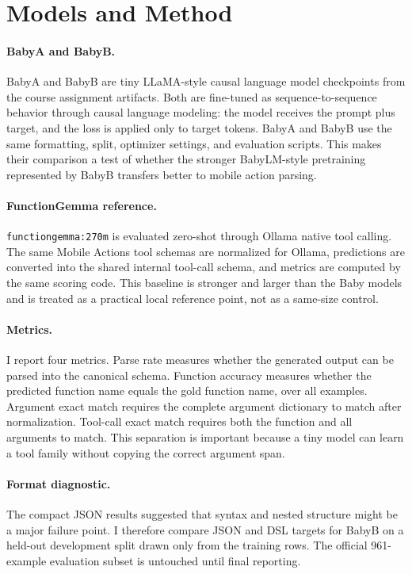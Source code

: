 \section{Models and Method}

\paragraph{BabyA and BabyB.}
BabyA and BabyB are tiny LLaMA-style causal language model checkpoints from the course assignment artifacts. Both are fine-tuned as sequence-to-sequence behavior through causal language modeling: the model receives the prompt plus target, and the loss is applied only to target tokens. BabyA and BabyB use the same formatting, split, optimizer settings, and evaluation scripts. This makes their comparison a test of whether the stronger BabyLM-style pretraining represented by BabyB transfers better to mobile action parsing.

\paragraph{FunctionGemma reference.}
\texttt{functiongemma:270m} is evaluated zero-shot through Ollama native tool calling. The same Mobile Actions tool schemas are normalized for Ollama, predictions are converted into the shared internal tool-call schema, and metrics are computed by the same scoring code. This baseline is stronger and larger than the Baby models and is treated as a practical local reference point, not as a same-size control.

\paragraph{Metrics.}
I report four metrics. Parse rate measures whether the generated output can be parsed into the canonical schema. Function accuracy measures whether the predicted function name equals the gold function name, over all examples. Argument exact match requires the complete argument dictionary to match after normalization. Tool-call exact match requires both the function and all arguments to match. This separation is important because a tiny model can learn a tool family without copying the correct argument span.

\paragraph{Format diagnostic.}
The compact JSON results suggested that syntax and nested structure might be a major failure point. I therefore compare JSON and DSL targets for BabyB on a held-out development split drawn only from the training rows. The official 961-example evaluation subset is untouched until final reporting.
